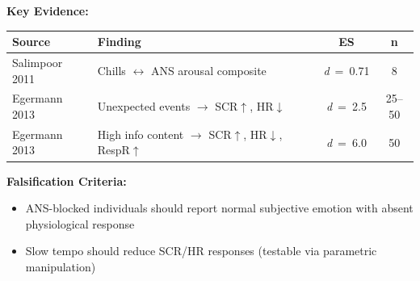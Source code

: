\documentclass[9pt,onecolumn]{article}
\newcommand{\cohend}[1]{\textit{d}~=~#1}
\begin{document}
\textbf{Key Evidence:}
\begin{center}
\small
\begin{tabular}{@{}llcc@{}}
\toprule
\textbf{Source} & \textbf{Finding} & \textbf{ES} & \textbf{n} \\
\midrule
Salimpoor 2011 & Chills $\leftrightarrow$ ANS arousal composite & \cohend{0.71} & 8 \\
Egermann 2013 & Unexpected events $\rightarrow$ SCR$\uparrow$, HR$\downarrow$ & \cohend{2.5} & 25--50 \\
Egermann 2013 & High info content $\rightarrow$ SCR$\uparrow$, HR$\downarrow$, RespR$\uparrow$ & \cohend{6.0} & 50 \\
\bottomrule
\end{tabular}
\end{center}

\textbf{Falsification Criteria:}
\begin{itemize}[leftmargin=*, topsep=0pt, itemsep=0pt]
\item ANS-blocked individuals should report normal subjective emotion with absent physiological response
\item Slow tempo should reduce SCR/HR responses (testable via parametric manipulation)
\end{itemize}
\end{document}

